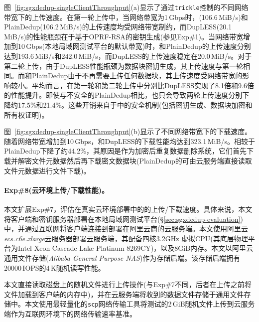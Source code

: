 图~\ref{fig:sgxdedup-singleClientThroughput}(a)显示了通过{\tt trickle}\cite{eriksen05}控制的不同网络带宽下的上传速度。在第一轮上传中，当网络带宽为1\,Gbps时，\sysnameS (106.6\,MiB/s)和PlainDedup(106.2\,MiB/s)的上传速度均受网络带宽制约，而DupLESS(20.1\,MiB/s)的性能瓶颈在于基于OPRF-RSA的密钥生成(参见Exp\#1)。当网络带宽增加到10\,Gbps(本地局域网测试平台的默认带宽)时，\sysnameS 和PlainDedup的上传速度分别达到193.6\,MiB/s和242.0\,MiB/s，而DupLESS的上传速度稳定在20.0\,MiB/s。对于第二轮上传，由于DupLESS性能瓶颈为数据块密钥生成，其上传速度与第一轮相同。而\sysnameS 和PlainDedup由于不再需要上传任何数据块，其上传速度受网络带宽的影响较小。平均而言，\sysnameS 在第一轮和第二轮上传中分别比DupLESS实现了8.1倍和9.6倍的性能提升。即使与不安全的PlainDedup相比，\sysnameS 也只会导致两轮上传速度分别下降约17.5\%和21.4\%。这些开销来自于\sysnameS 中的安全机制(包括密钥生成、数据块加密和所有权证明)。

图~\ref{fig:sgxdedup-singleClientThroughput}(b)显示了不同网络带宽下的下载速度。随着网络带宽增加到10\,Gbps，\sysnameS 和DupLESS的下载性能均达到323.1\,MiB/s。相较于PlainDedup下降了约44.2\%，其原因是作为加密后重复数据删除系统，它们首先下载并解密文件元数据然后再下载密文数据块(PlainDedup的可由云服务端直接读取文件元数据进行文件下载)。

\paragraph*{Exp\#8(云环境上传/下载性能)。}本文扩展Exp\#7，评估在真实云环境部署中的\sysnameS 的上传/下载速度。具体来说，本文将客户端和密钥服务器部署在本地局域网测试平台(\S\ref{sec:sgxdedup-evaluation})中，并通过互联网将客户端连接到部署在阿里云商的云服务端。本文使用阿里云\textit{ecs.c6e.xlarge}云服务器部署云服务端，其配备四核3.2GHz 虚拟CPU(其底层物理平台为Intel Xeon Cascade Lake Platinum 8269CY)，以及8GiB内存。本文以阿里云通用文件存储(\textit{Alibaba General Purpose NAS})作为存储后端。该存储后端拥有20000\,IOPS的4\,K随机读写性能。

本文直接读取磁盘上的随机文件进行上传操作(与Exp\#7不同，后者在上传之前将文件加载到客户端的内存中)，并在云服务端将收到的数据文件存储于通用文件存储中。本文使用最轻量化的{\tt scp}网络传输工具将测试的2\,GiB随机文件上传到云服务端作为互联网环境下的网络传输速率基准。

